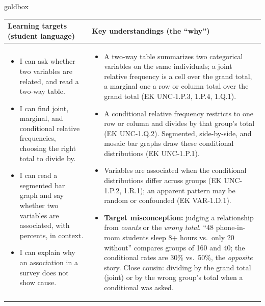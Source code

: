 \documentclass[10pt]{article}
\begin{document}
\renewcommand{\arraystretch}{1.4}
\boxguard
\begin{skillbox}{goldbox}
\begin{tabularx}{\linewidth}{@{}X|X@{}}
\textbf{Learning targets (student language)} & \textbf{Key understandings (the ``why'')} \\[2pt]
\hline
\vspace{-6pt}
\begin{itemize}[leftmargin=1.1em, nosep, after=\vspace{2pt}]
  \item I can ask whether two variables are related, and read a two-way table.
  \item I can find joint, marginal, and conditional relative frequencies, choosing the right
        total to divide by.
  \item I can read a segmented bar graph and say whether two variables are associated,
        with percents, in context.
  \item I can explain why an association in a survey does not show cause.
\end{itemize}
&
\vspace{-6pt}
\begin{itemize}[leftmargin=1.1em, nosep, after=\vspace{2pt}]
  \item A two-way table summarizes two categorical variables on the same individuals; a
        joint relative frequency is a cell over the grand total, a marginal one a row or
        column total over the grand total (EK UNC-1.P.3, 1.P.4, 1.Q.1).
  \item A conditional relative frequency restricts to one row or column and divides by that
        group's total (EK UNC-1.Q.2). Segmented, side-by-side, and mosaic bar graphs draw
        these conditional distributions (EK UNC-1.P.1).
  \item Variables are associated when the conditional distributions differ across groups
        (EK UNC-1.P.2, 1.R.1); an apparent pattern may be random or confounded (EK VAR-1.D.1).
  \item \textbf{Target misconception:} judging a relationship from \emph{counts} or the
        \emph{wrong total}. ``48 phone-in-room students sleep 8+ hours vs.\ only 20 without''
        compares groups of 160 and 40; the conditional rates are 30\% vs.\ 50\%, the
        \emph{opposite} story. Close cousin: dividing by the grand total (joint) or by the
        wrong group's total when a conditional was asked.
\end{itemize}
\end{tabularx}
\end{skillbox}
\end{document}
